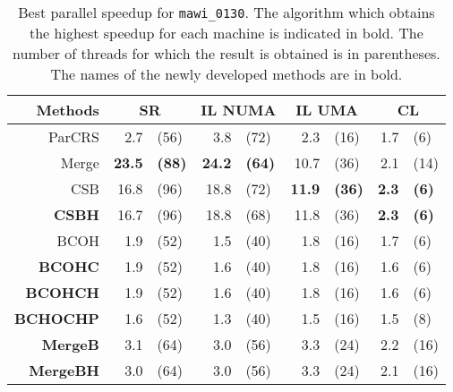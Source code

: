 \begin{table}
    \centering
    \small
    \caption{Best parallel speedup for \texttt{mawi\_0130}. The algorithm which obtains the highest speedup for each machine is indicated in bold. The number of threads for which the result is obtained is in parentheses. The names of the newly developed methods are in bold.}\label{tab:MawiSpeedup}
    \begin{tabular}{r r@{ }l r@{ }l r@{ }lr@{ }l }
        Methods & \multicolumn{2}{c}{SR} & \multicolumn{2}{c}{IL NUMA} & \multicolumn{2}{c}{IL UMA} & \multicolumn{2}{c}{CL}\\
        \midrule
        ParCRS           &  2.7          & (56)          &  3.8          & (72)          &  2.3          & (16)          & 1.7          & (6) \\
        Merge            & \textbf{23.5} & \textbf{(88)} & \textbf{24.2} & \textbf{(64)} & 10.7          & (36)          & 2.1          & (14) \\
        CSB              & 16.8          & (96)          & 18.8          & (72)          & \textbf{11.9} & \textbf{(36)} & \textbf{2.3} & \textbf{(6)} \\
        \textbf{CSBH}    & 16.7          & (96)          & 18.8          & (68)          & 11.8          & (36)          & \textbf{2.3} & \textbf{(6)} \\
        BCOH             &  1.9          & (52)          &  1.5          & (40)          &  1.8          & (16)          & 1.7          & (6) \\
        \textbf{BCOHC}   &  1.9          & (52)          &  1.6          & (40)          &  1.8          & (16)          & 1.6          & (6) \\
        \textbf{BCOHCH}  &  1.9          & (52)          &  1.6          & (40)          &  1.8          & (16)          & 1.6          & (6) \\
        \textbf{BCHOCHP} &  1.6          & (52)          &  1.3          & (40)          &  1.5          & (16)          & 1.5          & (8) \\
        \textbf{MergeB}  &  3.1          & (64)          &  3.0          & (56)          &  3.3          & (24)          & 2.2          & (16) \\
        \textbf{MergeBH} &  3.0          & (64)          &  3.0          & (56)          &  3.3          & (24)          & 2.1          & (16) \\
    \end{tabular}
\end{table}